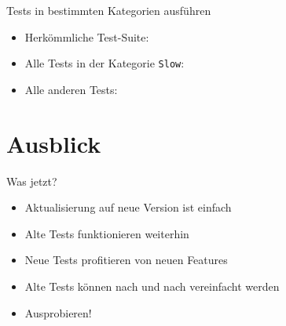\begin{frame}{Tests in bestimmten Kategorien ausführen}
	\begin{itemize}
		\item Herkömmliche Test-Suite:
		\item Alle Tests in der Kategorie \texttt{Slow}:
		\item Alle anderen Tests:
	\end{itemize}
\end{frame}

{
\date{Quint Buchholz, Mann auf einer Leiter}
\part{Ausblick}
}

\begin{frame}{Was jetzt?}
	\begin{itemize}
		\item Aktualisierung auf neue Version ist einfach
		\item Alte Tests funktionieren weiterhin
		\item Neue Tests profitieren von neuen Features
		\item Alte Tests können nach und nach vereinfacht werden
		\item<alert@2> Ausprobieren!
	\end{itemize}
\end{frame}

